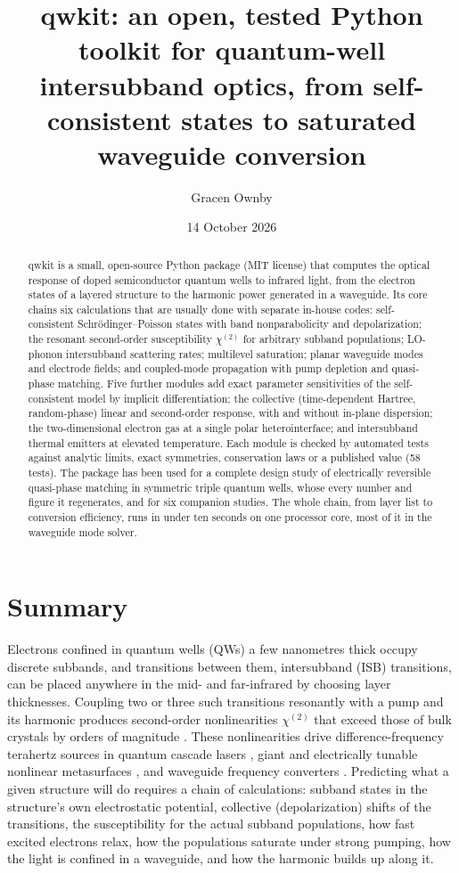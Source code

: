 \documentclass[11pt]{article}
\title{qwkit: an open, tested Python toolkit for quantum-well intersubband optics, from self-consistent states to saturated waveguide conversion}
\author{Gracen Ownby}
\affil{University of Oklahoma, Norman, Oklahoma, USA}
\date{\small 14 October 2026}
\newcommand{\chitwo}{\chi^{(2)}}
\begin{document}
\maketitle

\begin{abstract}
qwkit is a small, open-source Python package (MIT license) that computes the optical response of doped semiconductor quantum wells to infrared light, from the electron states of a layered structure to the harmonic power generated in a waveguide. Its core chains six calculations that are usually done with separate in-house codes: self-consistent Schr\"odinger--Poisson states with band nonparabolicity and depolarization; the resonant second-order susceptibility $\chitwo$ for arbitrary subband populations; LO-phonon intersubband scattering rates; multilevel saturation; planar waveguide modes and electrode fields; and coupled-mode propagation with pump depletion and quasi-phase matching. Five further modules add exact parameter sensitivities of the self-consistent model by implicit differentiation; the collective (time-dependent Hartree, random-phase) linear and second-order response, with and without in-plane dispersion; the two-dimensional electron gas at a single polar heterointerface; and intersubband thermal emitters at elevated temperature. Each module is checked by automated tests against analytic limits, exact symmetries, conservation laws or a published value (58 tests). The package has been used for a complete design study of electrically reversible quasi-phase matching in symmetric triple quantum wells, whose every number and figure it regenerates, and for six companion studies. The whole chain, from layer list to conversion efficiency, runs in under ten seconds on one processor core, most of it in the waveguide mode solver.
\end{abstract}

\section{Summary}
Electrons confined in quantum wells (QWs) a few nanometres thick occupy discrete subbands, and transitions between them, intersubband (ISB) transitions, can be placed anywhere in the mid- and far-infrared by choosing layer thicknesses. Coupling two or three such transitions resonantly with a pump and its harmonic produces second-order nonlinearities $\chitwo$ that exceed those of bulk crystals by orders of magnitude \cite{Fejer1989,Rosencher1991,Vurgaftman2021}. These nonlinearities drive difference-frequency terahertz sources in quantum cascade lasers \cite{Belkin2007}, giant and electrically tunable nonlinear metasurfaces \cite{Lee2014,Yu2022}, and waveguide frequency converters \cite{Chesi2023}. Predicting what a given structure will do requires a chain of calculations: subband states in the structure's own electrostatic potential, collective (depolarization) shifts of the transitions, the susceptibility for the actual subband populations, how fast excited electrons relax, how the populations saturate under strong pumping, how the light is confined in a waveguide, and how the harmonic builds up along it.
\end{document}
